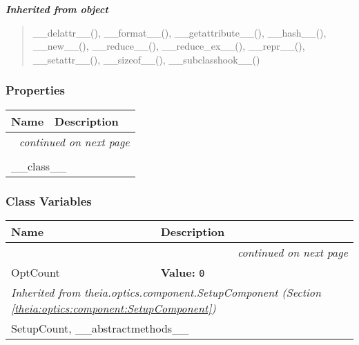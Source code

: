 \large{\textbf{\textit{Inherited from object}}}

\begin{quote}
\_\_delattr\_\_(), \_\_format\_\_(), \_\_getattribute\_\_(), \_\_hash\_\_(), \_\_new\_\_(), \_\_reduce\_\_(), \_\_reduce\_ex\_\_(), \_\_repr\_\_(), \_\_setattr\_\_(), \_\_sizeof\_\_(), \_\_subclasshook\_\_()
\end{quote}


  \subsubsection{Properties}

    \vspace{-1cm}
\hspace{\varindent}\begin{longtable}{|p{\varnamewidth}|p{\vardescrwidth}|l}
\cline{1-2}
\cline{1-2} \centering \textbf{Name} & \centering \textbf{Description}& \\
\cline{1-2}
\endhead\cline{1-2}\multicolumn{3}{r}{\small\textit{continued on next page}}\\\endfoot\cline{1-2}
\endlastfoot\multicolumn{2}{|l|}{\textit{Inherited from object}}\\
\multicolumn{2}{|p{\varwidth}|}{\raggedright \_\_class\_\_}\\
\cline{1-2}
\end{longtable}



  \subsubsection{Class Variables}

    \vspace{-1cm}
\hspace{\varindent}\begin{longtable}{|p{\varnamewidth}|p{\vardescrwidth}|l}
\cline{1-2}
\cline{1-2} \centering \textbf{Name} & \centering \textbf{Description}& \\
\cline{1-2}
\endhead\cline{1-2}\multicolumn{3}{r}{\small\textit{continued on next page}}\\\endfoot\cline{1-2}
\endlastfoot\raggedright O\-p\-t\-C\-o\-u\-n\-t\- & \raggedright \textbf{Value:} 
{\tt 0}&\\
\cline{1-2}
\multicolumn{2}{|l|}{\textit{Inherited from theia.optics.component.SetupComponent \textit{(Section \ref{theia:optics:component:SetupComponent})}}}\\
\multicolumn{2}{|p{\varwidth}|}{\raggedright SetupCount, \_\_abstractmethods\_\_}\\
\cline{1-2}
\end{longtable}

